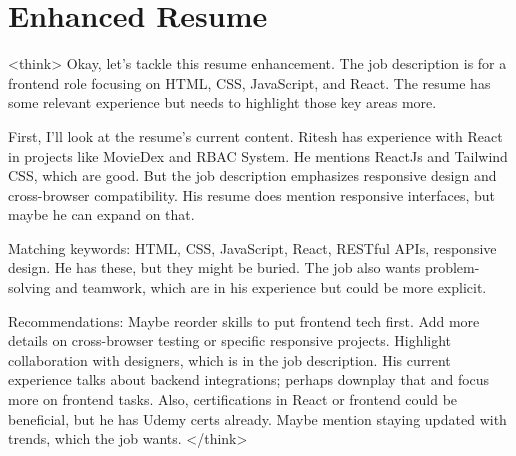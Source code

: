 \documentclass[11pt]{article}
\begin{document}
\section*{Enhanced Resume}

<think>
Okay, let's tackle this resume enhancement. The job description is for a frontend role focusing on HTML, CSS, JavaScript, and React. The resume has some relevant experience but needs to highlight those key areas more.

First, I'll look at the resume's current content. Ritesh has experience with React in projects like MovieDex and RBAC System. He mentions ReactJs and Tailwind CSS, which are good. But the job description emphasizes responsive design and cross-browser compatibility. His resume does mention responsive interfaces, but maybe he can expand on that.

Matching keywords: HTML, CSS, JavaScript, React, RESTful APIs, responsive design. He has these, but they might be buried. The job also wants problem-solving and teamwork, which are in his experience but could be more explicit.

Recommendations: Maybe reorder skills to put frontend tech first. Add more details on cross-browser testing or specific responsive projects. Highlight collaboration with designers, which is in the job description. His current experience talks about backend integrations; perhaps downplay that and focus more on frontend tasks. Also, certifications in React or frontend could be beneficial, but he has Udemy certs already. Maybe mention staying updated with trends, which the job wants.
</think>
\end{document}
